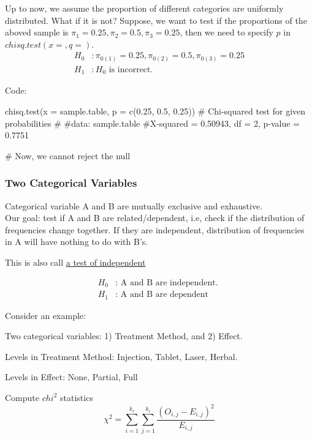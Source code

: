 \documentclass[12pt]{article}
\begin{document}
Up to now, we assume the proportion of different categories are 
uniformly distributed. What if it is not?
Suppose, we want to test if the proportions of the aboved sample 
is $ \pi_1 = 0.25, \pi_2 = 0.5, \pi_3 = 0.25 $, then we need
to specify $ p $ in $ chisq.test(x = , q = ) $.
\begin{align*}
H_0&: \pi_{0(1)} = 0.25, \pi_{0(2)} = 0.5, \pi_{0(3)} = 0.25\\
H_1&: H_0 \text{ is incorrect. }
\end{align*}

Code:
\begin{rc}
chisq.test(x = sample.table, p = c(0.25, 0.5, 0.25))
#        Chi-squared test for given probabilities
#
#data:  sample.table
#X-squared = 0.50943, df = 2, p-value = 0.7751

# Now, we cannot reject the null
\end{rc}




\subsubsection{Two Categorical Variables}

Categorical variable A and B are mutually exclusive and exhaustive.\\
Our goal: test if A and B are related/dependent, i.e, check if the 
distribution of frequencies change together. If they are independent,
distribution of frequencies in A will have nothing to do with B's.

This is also call {\underline {a test of independent }}

\begin{align*}
H_0&: \text{ A and B are independent. }\\
H_1&: \text{ A and B are dependent }
\end{align*}

Consider an example:

Two categorical variables: 1) Treatment Method, and 2) Effect.

Levels in Treatment Method: Injection, Tablet, Laser, Herbal.

Levels in Effect: None, Partial, Full


Compute $ chi^{2} $ statistics
\begin{equation*}
		\chi^{2} = \sum\limits_{i = 1} ^{k_{r}} \sum\limits_{j = 1} ^{k_{c}}
\frac{
		(O_{i,j} - E_{i,j})^{2}}{ E_{i,j}}
\end{equation*}
\end{document}
